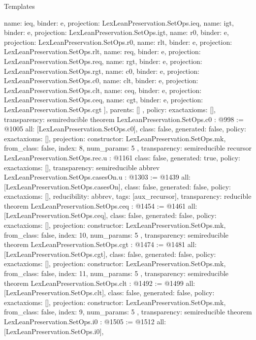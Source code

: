 \begin{lexlean}{Templates}
\begin{coremodule}
{{{        {name: ieq, binder: e, projection: LexLeanPreservation.SetOps.ieq},
        {name: igt, binder: e, projection: LexLeanPreservation.SetOps.igt},
        {name: r0, binder: e, projection: LexLeanPreservation.SetOps.r0},
        {name: rlt, binder: e, projection: LexLeanPreservation.SetOps.rlt},
        {name: req, binder: e, projection: LexLeanPreservation.SetOps.req},
        {name: rgt, binder: e, projection: LexLeanPreservation.SetOps.rgt},
        {name: c0, binder: e, projection: LexLeanPreservation.SetOps.c0},
        {name: clt, binder: e, projection: LexLeanPreservation.SetOps.clt},
        {name: ceq, binder: e, projection: LexLeanPreservation.SetOps.ceq},
        {name: cgt, binder: e, projection: LexLeanPreservation.SetOps.cgt}
      ],
      parents: []
    }
  },
  policy: exact{axioms: []},
  transparency: semireducible
}
theorem LexLeanPreservation.SetOps.c0 : @998 := @1005 {
  all: [LexLeanPreservation.SetOps.c0],
  class: false,
  generated: false,
  policy: exact{axioms: []},
  projection: {
    constructor: LexLeanPreservation.SetOps.mk,
    from_class: false,
    index: 8,
    num_params: 5
  },
  transparency: semireducible
}
recursor LexLeanPreservation.SetOps.rec.{u} : @1161 {
  class: false,
  generated: true,
  policy: exact{axioms: []},
  transparency: semireducible
}
abbrev LexLeanPreservation.SetOps.casesOn.{u} : @1303 := @1439 {
  all: [LexLeanPreservation.SetOps.casesOn],
  class: false,
  generated: false,
  policy: exact{axioms: []},
  reducibility: abbrev{},
  tags: [aux_recursor],
  transparency: reducible
}
theorem LexLeanPreservation.SetOps.ceq : @1454 := @1461 {
  all: [LexLeanPreservation.SetOps.ceq],
  class: false,
  generated: false,
  policy: exact{axioms: []},
  projection: {
    constructor: LexLeanPreservation.SetOps.mk,
    from_class: false,
    index: 10,
    num_params: 5
  },
  transparency: semireducible
}
theorem LexLeanPreservation.SetOps.cgt : @1474 := @1481 {
  all: [LexLeanPreservation.SetOps.cgt],
  class: false,
  generated: false,
  policy: exact{axioms: []},
  projection: {
    constructor: LexLeanPreservation.SetOps.mk,
    from_class: false,
    index: 11,
    num_params: 5
  },
  transparency: semireducible
}
theorem LexLeanPreservation.SetOps.clt : @1492 := @1499 {
  all: [LexLeanPreservation.SetOps.clt],
  class: false,
  generated: false,
  policy: exact{axioms: []},
  projection: {
    constructor: LexLeanPreservation.SetOps.mk,
    from_class: false,
    index: 9,
    num_params: 5
  },
  transparency: semireducible
}
theorem LexLeanPreservation.SetOps.i0 : @1505 := @1512 {
  all: [LexLeanPreservation.SetOps.i0],
}
\end{coremodule}
\end{lexlean}

